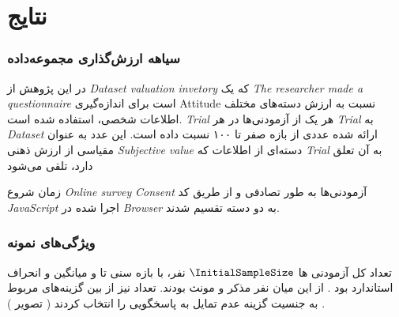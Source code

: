 \chapter{نتایج}
\label{chap:results}


\subsection{سیاهه ارزش‌گذاری مجموعه‌داده}

در این پژوهش از
{\textit{\gls{Dataset valuation invetory}}}
که یک
{\textit{\gls{The researcher made a questionnaire}}}
است برای اندازه‌گیری
\gls{Attitude}
نسبت به ارزش دسته‌های مختلف اطلاعات شخصی، استفاده شده است.
\textit{\gls{Trial}}
هر یک از آزمودنی‌ها در هر
\textit{\gls{Trial}}
به
\textit{\gls{Dataset}}
ارائه شده عددی از بازه صفر تا ۱۰۰ نسبت داده است. این عدد به عنوان مقیاسی از ارزش ذهنی
\textit{\gls{Subjective value}}
دسته‌ای از اطلاعات که
\textit{\gls{Trial}}
به آن تعلق دارد، تلقی می‌شود

زمان شروع
\textit{\gls{Online survey}}
\textit{\gls{Consent}}
آزمودنی‌ها به طور تصادفی و از طریق کد
\textit{\gls{JavaScript}}
اجرا شده در
\textit{\gls{Browser}}
به دو دسته تقسیم شدند.
\subsection{ویژگی‌های نمونه}
تعداد کل آزمودنی ها
$\InitialSampleSize$
نفر،
با بازه سنی
\ageMin
تا
\ageMax
و
میانگین
\sampleAgeMean
و انحراف استاندارد
\sampleAgeSD
بود
\!.
از این میان
\SampleSizeMale
نفر مذکر و
\SampleSizeFemale
مونث بودند.
تعداد
\SampleSizeSexualityNoAnswer
نیز از بین گزینه‌های مربوط به جنسیت گزینه عدم تمایل به پاسخگویی را انتخاب کردند
(
تصویر \label{fig:sexualityAgainstPopulation}
)
\!.

